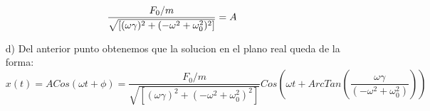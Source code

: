 \documentclass[a4paper]{article}
\begin{document}
\begin{answer}[Problema 5.]
\begin{enumerate}
\begin{equation*}
\begin{split}
                \end{split}
            \end{equation*}
            \begin{equation*}
                \begin{split}
                    \frac{F_0/m}{\sqrt{\left[(\omega\gamma)^2+ (-\omega^2  + \omega_0^2)^2\right]}}
                    &= A\hspace{0.3cm}\\
                \end{split}
            \end{equation*}
        \item[d)] Del anterior punto obtenemos que la solucion en el plano real queda de la forma:
            $$x(t) = ACos(\omega t + \phi) =   \frac{F_0/m}{\sqrt{\left[(\omega\gamma)^2+ (-\omega^2  + \omega_0^2)^2\right]}}Cos\left(\omega t + ArcTan\left(\frac{ \omega\gamma}{ (-\omega^2  + \omega_0^2)}\right)\right)$$
    \end{enumerate}
\end{answer}
\end{document}
